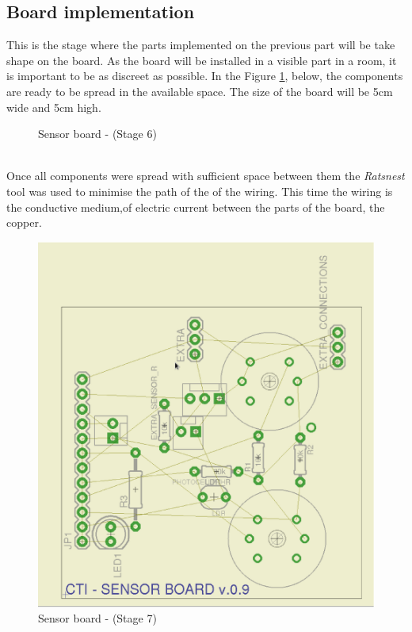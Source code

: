 \documentclass[12pt,a4paper,draft]{report}
\begin{document}
\subsection{Board implementation}
This is the stage where the parts implemented on the previous part will be take shape on the board. As the board will be installed in a visible part in a room, it is important to be as discreet as possible. In the Figure \ref{Sensor-brd-s6}, below, the components are ready to be spread in the available space. The size of the board will be 5cm wide and 5cm high.
\ \\
\begin{figure}[H]
\centering
\caption{Sensor board -  (Stage 6)}
\label{Sensor-brd-s6}
\end{figure}
\ \\
Once all components were spread with sufficient space between them the \textit{Ratsnest} tool was used to minimise the path of the of the wiring. This time the wiring is the conductive medium,of electric current between the parts of the board, the copper.
\ \\
\begin{figure}[H]
\centering
\includegraphics*[scale=0.25]{sens_brd_s7}
\caption{Sensor board -  (Stage 7)}
\label{Sensor-brd-s7}
\end{figure}
\end{document}
